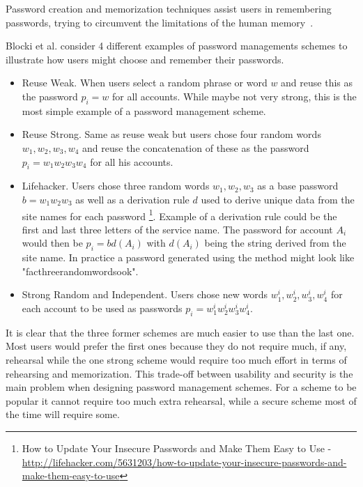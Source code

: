 Password creation and memorization techniques assist users in remembering passwords, trying to circumvent the limitations of the human memory~\cite{human-memory}. 
\par Blocki et al. \cite{naturally-rehearsing} consider 4 different examples of password managements schemes to illustrate how users might choose and remember their passwords.
\begin{itemize}
    \item{ Reuse Weak. } When users select a random phrase or word $w$ and reuse this as the password $p_i=w$ for all accounts. While maybe not very strong, this is the most simple example of a password management scheme.
    \item{ Reuse Strong. } Same as reuse weak but users chose four random words $w_1,w_2,w_3,w_4$ and reuse the concatenation of these as the password $p_i = w_1w_2w_3w_4$ for all his accounts.
    \item{Lifehacker.} Users chose three random words $w_1, w_2, w_3$ as a base password $b=w_1w_2w_3$ as well as a derivation rule $d$ used to derive unique data from the site names for each password \footnote{How to Update Your Insecure Passwords and Make Them Easy to Use - \url{http://lifehacker.com/5631203/how-to-update-your-insecure-passwords-and-make-them-easy-to-use}}. Example of a derivation rule could be the first and last three letters of the service name. The password for account $A_i$ would then be $p_i = b d(A_i)$ with $d(A_i)$ being the string derived from the site name. In practice a password generated using the method might look like "facthreerandomwordsook". 
    \item{Strong Random and Independent.} Users chose new words $w^i_1, w^i_2, w^i_3, w^i_4$ for each account to be used as passwords $p_i = w^i_1w^i_2w^i_3w^i_4$.
\end{itemize}
It is clear that the three former schemes are much easier to use than the last one. Most users would prefer the first ones because they do not require much, if any, rehearsal while the one strong scheme would require too much effort in terms of rehearsing and memorization. This trade-off between usability and security is the main problem when designing password management schemes. For a scheme to be popular it cannot require too much extra rehearsal, while a secure scheme most of the time will require some.




